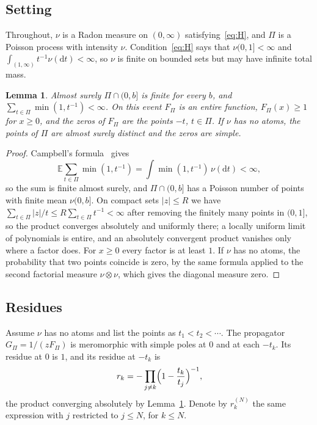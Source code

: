 \documentclass[aps,prd,twocolumn,superscriptaddress,nofootinbib,longbibliography,floatfix,amsmath,amssymb,10pt]{revtex4-2}
\newtheorem{lemma}[theorem]{Lemma}
\theoremstyle{definition}
\theoremstyle{remark}
\newcommand{\E}{\mathbb{E}}
\newcommand{\dd}{\mathrm{d}}
\begin{document}
\subsection{Setting}

Throughout, $\nu$ is a Radon measure on $(0,\infty)$ satisfying~\eqref{eq:H},
and $\Pi$ is a Poisson process with intensity $\nu$. Condition~\eqref{eq:H}
says that $\nu(0,1]<\infty$ and $\int_{(1,\infty)}t^{-1}\nu(\dd t)<\infty$,
so $\nu$ is finite on bounded sets but may have infinite total mass.

\begin{lemma}\label{lem:product}
Almost surely $\Pi\cap(0,b]$ is finite for every $b$, and
$\sum_{t\in\Pi}\min(1,t^{-1})<\infty$. On this event $F_\Pi$ is an entire
function, $F_\Pi(x)\ge1$ for $x\ge0$, and the zeros of $F_\Pi$ are the points
$-t$, $t\in\Pi$. If $\nu$ has no atoms, the points of $\Pi$ are almost surely
distinct and the zeros are simple.
\end{lemma}

\begin{proof}
Campbell's formula~\cite[Prop.~2.7]{LastPenrose2017} gives
\[
\E\sum_{t\in\Pi}\min(1,t^{-1})=\int\min(1,t^{-1})\,\nu(\dd t)<\infty ,
\]
so the sum is finite almost surely, and $\Pi\cap(0,b]$ has a Poisson number of
points with finite mean $\nu(0,b]$. On compact sets $|z|\le R$ we have
$\sum_{t\in\Pi}|z|/t\le R\sum_{t\in\Pi}t^{-1}<\infty$ after removing the
finitely many points in $(0,1]$, so the product converges absolutely and
uniformly there; a locally uniform limit of polynomials is entire, and an
absolutely convergent product vanishes only where a factor does. For $x\ge0$
every factor is at least $1$. If $\nu$ has no atoms, the probability that two
points coincide is zero, by the same formula applied to the second factorial
measure $\nu\otimes\nu$, which gives the diagonal measure zero.
\end{proof}

\subsection{Residues}

Assume $\nu$ has no atoms and list the points as $t_1<t_2<\cdots$. The
propagator $G_\Pi=1/(zF_\Pi)$ is meromorphic with simple poles at $0$ and at
each $-t_k$. Its residue at $0$ is $1$, and its residue at $-t_k$ is
\begin{equation}\label{eq:rk}
r_k=-\prod_{j\neq k}\Bigl(1-\frac{t_k}{t_j}\Bigr)^{-1},
\end{equation}
the product converging absolutely by Lemma~\ref{lem:product}. Denote by
$r_k^{(N)}$ the same expression with $j$ restricted to $j\le N$, for $k\le N$.
\end{document}

